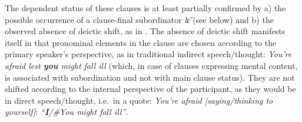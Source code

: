 \documentclass[output=paper,colorlinks,citecolor=brown
]{langscibook}
\begin{document}
\ea \label{ex:Fed39}
\z
\z


The dependent status of these clauses is at least partially confirmed by a) the possible occurrence of a clause-final subordinator \textit{lɛ̌} (see below) and b) the observed absence of deictic shift, as in . The absence of deictic shift manifests itself in that pronominal elements in the clause are chosen according to the primary speaker's perspective, as in traditional indirect speech/thought: \textit{You're afraid lest \textbf{you} might fall ill} (which, in case of clauses expressing mental content, is associated with subordination and not with main clause status). They are not shifted according to the internal perspective of the participant, as they would be in direct speech\slash thought, i.e.\ in a quote: \textit{You're afraid \textup{[}saying\slash thinking to yourself\textup{]}}: \textit{\mbox{``\textbf{I}/\#You} might fall ill''}.


\z
\end{document}
